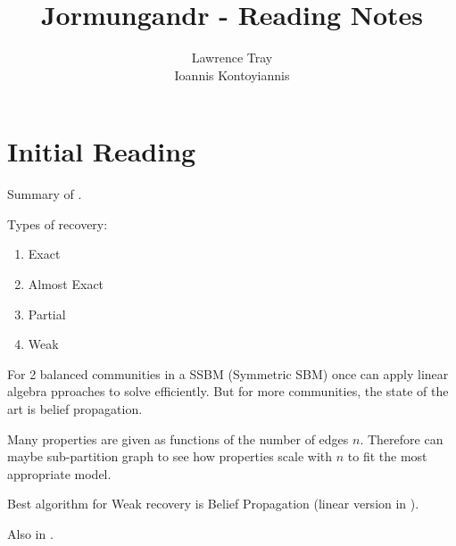 \documentclass[]{article}
\title{Jormungandr - Reading Notes}
\author{Lawrence Tray \\ Ioannis Kontoyiannis}
\begin{document}
\maketitle

\section{Initial Reading}

Summary of \cite{Abbe}.

Types of recovery:
\begin{enumerate}
	\item Exact
	\item Almost Exact
	\item Partial
	\item Weak
\end{enumerate}

For 2 balanced communities in a SSBM (Symmetric SBM) once can apply linear algebra pproaches to solve efficiently. But for more communities, the state of the art is belief propagation. 

Many properties are given as functions of the number of edges $n$. Therefore can maybe sub-partition graph to see how properties scale with $n$ to fit the most appropriate model.

Best algorithm for Weak recovery is Belief Propagation (linear version in \cite{Linear-ABP}).

Also in \cite{SBM-Achieve}.

\nocite{*}
\printbibliography
\end{document}
